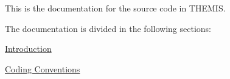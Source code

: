This is the documentation for the source code in T\+H\+E\+M\+IS.



The documentation is divided in the following sections\+:
\begin{DoxyItemize}
\item \hyperlink{intro}{Introduction}
\item \hyperlink{conv}{Coding Conventions} 
\end{DoxyItemize}